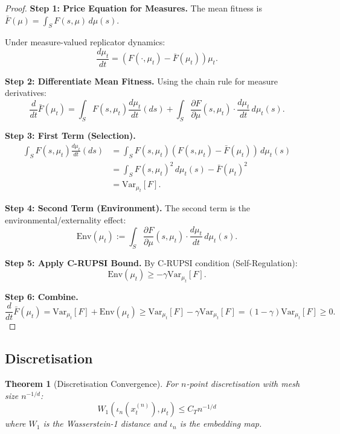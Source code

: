\documentclass[12pt]{article}
\newtheorem{theorem}{Theorem}[section]
\newcommand{\Var}{\mathrm{Var}}
\begin{document}
\begin{proof}
\textbf{Step 1: Price Equation for Measures.}
The mean fitness is $\bar{F}(\mu) = \int_S F(s, \mu) \, d\mu(s)$.

Under measure-valued replicator dynamics:
\[
\frac{d\mu_t}{dt} = (F(\cdot, \mu_t) - \bar{F}(\mu_t)) \mu_t.
\]

\textbf{Step 2: Differentiate Mean Fitness.}
Using the chain rule for measure derivatives:
\[
\frac{d}{dt} \bar{F}(\mu_t) = \int_S F(s, \mu_t) \frac{d\mu_t}{dt}(ds) + \int_S \frac{\partial F}{\partial \mu}(s, \mu_t) \cdot \frac{d\mu_t}{dt} \, d\mu_t(s).
\]

\textbf{Step 3: First Term (Selection).}
\begin{align*}
\int_S F(s, \mu_t) \frac{d\mu_t}{dt}(ds) &= \int_S F(s, \mu_t) (F(s, \mu_t) - \bar{F}(\mu_t)) \, d\mu_t(s) \\
&= \int_S F(s, \mu_t)^2 \, d\mu_t(s) - \bar{F}(\mu_t)^2 \\
&= \Var_{\mu_t}[F].
\end{align*}

\textbf{Step 4: Second Term (Environment).}
The second term is the environmental/externality effect:
\[
\text{Env}(\mu_t) := \int_S \frac{\partial F}{\partial \mu}(s, \mu_t) \cdot \frac{d\mu_t}{dt} \, d\mu_t(s).
\]

\textbf{Step 5: Apply C-RUPSI Bound.}
By C-RUPSI condition (Self-Regulation):
\[
\text{Env}(\mu_t) \geq -\gamma \Var_{\mu_t}[F].
\]

\textbf{Step 6: Combine.}
\[
\frac{d}{dt} \bar{F}(\mu_t) = \Var_{\mu_t}[F] + \text{Env}(\mu_t) \geq \Var_{\mu_t}[F] - \gamma \Var_{\mu_t}[F] = (1 - \gamma) \Var_{\mu_t}[F] \geq 0.
\]
\end{proof}

\subsection{Discretisation}

\begin{theorem}[Discretisation Convergence]
\label{thm:discretisation}
For $n$-point discretisation with mesh size $n^{-1/d}$:
\[
W_1(\iota_n(x_t^{(n)}), \mu_t) \leq C_T n^{-1/d}
\]
where $W_1$ is the Wasserstein-1 distance and $\iota_n$ is the embedding map.
\end{theorem}
\end{document}
